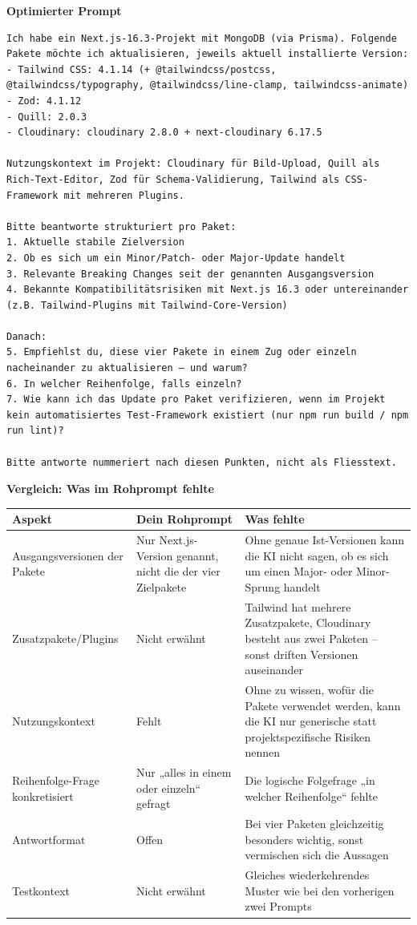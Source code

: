\documentclass[11pt,a4paper]{article}
\newcommand{\minihead}[1]{\par\needspace{5\baselineskip}\noindent\textbf{#1}\par\nobreak}
\begin{document}
\minihead{Optimierter Prompt}
\begin{lstlisting}
Ich habe ein Next.js-16.3-Projekt mit MongoDB (via Prisma). Folgende Pakete möchte ich aktualisieren, jeweils aktuell installierte Version:
- Tailwind CSS: 4.1.14 (+ @tailwindcss/postcss, @tailwindcss/typography, @tailwindcss/line-clamp, tailwindcss-animate)
- Zod: 4.1.12
- Quill: 2.0.3
- Cloudinary: cloudinary 2.8.0 + next-cloudinary 6.17.5

Nutzungskontext im Projekt: Cloudinary für Bild-Upload, Quill als Rich-Text-Editor, Zod für Schema-Validierung, Tailwind als CSS-Framework mit mehreren Plugins.

Bitte beantworte strukturiert pro Paket:
1. Aktuelle stabile Zielversion
2. Ob es sich um ein Minor/Patch- oder Major-Update handelt
3. Relevante Breaking Changes seit der genannten Ausgangsversion
4. Bekannte Kompatibilitätsrisiken mit Next.js 16.3 oder untereinander (z.B. Tailwind-Plugins mit Tailwind-Core-Version)

Danach:
5. Empfiehlst du, diese vier Pakete in einem Zug oder einzeln nacheinander zu aktualisieren – und warum?
6. In welcher Reihenfolge, falls einzeln?
7. Wie kann ich das Update pro Paket verifizieren, wenn im Projekt kein automatisiertes Test-Framework existiert (nur npm run build / npm run lint)?

Bitte antworte nummeriert nach diesen Punkten, nicht als Fliesstext.
\end{lstlisting}

\minihead{Vergleich: Was im Rohprompt fehlte}
\begin{center}
\small
\begin{tabularx}{\textwidth}{>{\raggedright\arraybackslash}p{3cm} >{\raggedright\arraybackslash}X >{\raggedright\arraybackslash}X}
\toprule
\textbf{Aspekt} & \textbf{Dein Rohprompt} & \textbf{Was fehlte} \\
\midrule
Ausgangsversionen der Pakete & Nur Next.js-Version genannt, nicht die der vier Zielpakete & Ohne genaue Ist-Versionen kann die KI nicht sagen, ob es sich um einen Major- oder Minor-Sprung handelt \\
Zusatzpakete/Plugins & Nicht erwähnt & Tailwind hat mehrere Zusatzpakete, Cloudinary besteht aus zwei Paketen – sonst driften Versionen auseinander \\
Nutzungskontext & Fehlt & Ohne zu wissen, wofür die Pakete verwendet werden, kann die KI nur generische statt projektspezifische Risiken nennen \\
Reihenfolge-Frage konkretisiert & Nur „alles in einem oder einzeln“ gefragt & Die logische Folgefrage „in welcher Reihenfolge“ fehlte \\
Antwortformat & Offen & Bei vier Paketen gleichzeitig besonders wichtig, sonst vermischen sich die Aussagen \\
Testkontext & Nicht erwähnt & Gleiches wiederkehrendes Muster wie bei den vorherigen zwei Prompts \\
\bottomrule
\end{tabularx}
\end{center}
\end{document}
